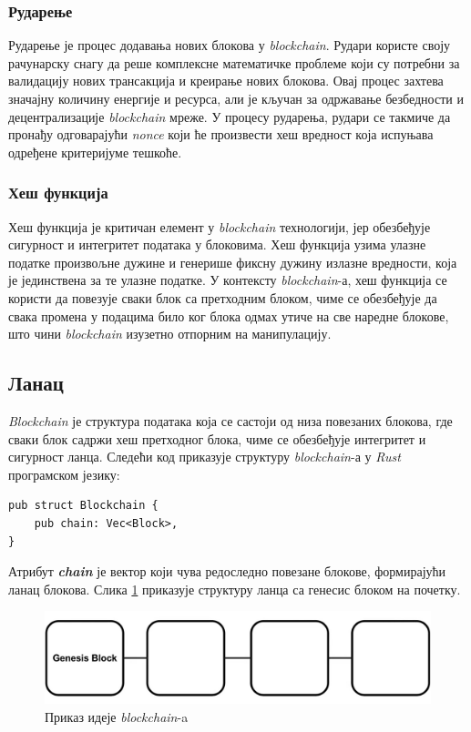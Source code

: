 \documentclass[12pt, a4paper]{article}
\begin{document}
\subsubsection{Рударење}
Рударење је процес додавања нових блокова у \textit{blockchain}. Рудари користе своју рачунарску снагу да реше комплексне математичке проблеме који су потребни за валидацију нових трансакција и креирање нових блокова. Овај процес захтева значајну количину енергије и ресурса, али је кључан за одржавање безбедности и децентрализације \textit{blockchain} мреже. У процесу рударења, рудари се такмиче да пронађу одговарајући \textit{nonce} који ће произвести хеш вредност која испуњава одређене критеријуме тешкоће.


\subsubsection{Хеш функција}
Хеш функција је критичан елемент у \textit{blockchain} технологији, јер обезбеђује сигурност и интегритет података у блоковима. Хеш функција узима улазне податке произвољне дужине и генерише фиксну дужину излазне вредности, која је јединствена за те улазне податке. У контексту \textit{blockchain}-а, хеш функција се користи да повезује сваки блок са претходним блоком, чиме се обезбеђује да свака промена у подацима било ког блока одмах утиче на све наредне блокове, што чини \textit{blockchain} изузетно отпорним на манипулацију.



\subsection{Ланац}
\textit{Blockchain} је структура података која се састоји од низа повезаних блокова, где сваки блок садржи хеш претходног блока, чиме се обезбеђује интегритет и сигурност ланца. Следећи код приказује структуру \textit{blockchain}-а у \textit{Rust} програмском језику:

\begin{verbatim}
pub struct Blockchain {
    pub chain: Vec<Block>,
}
\end{verbatim}

Атрибут \textit{\textbf{chain}} је вектор који чува редоследно повезане блокове, формирајући ланац блокова.
Слика \ref{fig:genesis-blockchain} приказује структуру ланца са генесис блоком на почетку.
\begin{figure}[h]
    \centering
    \includegraphics[width=1\linewidth]{slike/blockchain.png}
    \caption{Приказ идеје \textit{blockchain}-a}
    \label{fig:genesis-blockchain}
\end{figure}
\end{document}
